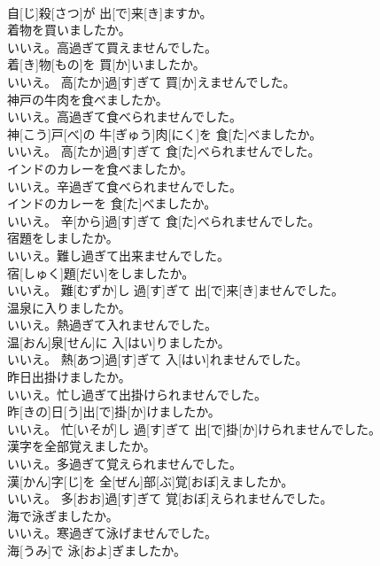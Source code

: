 \documentclass[8pt]{extreport}
\begin{document}
\begin{CJK}{UTF8}{min}
\\	自[じ]殺[さつ]が 出[で]来[き]ますか。
\\	着物を買いましたか。 
\\	いいえ。高過ぎて買えませんでした。	
\\	着[き]物[もの]を 買[か]いましたか。 
\\	いいえ。 高[たか]過[す]ぎて 買[か]えませんでした。
\\	神戸の牛肉を食べましたか。 
\\	いいえ。高過ぎて食べられませんでした。	
\\	神[こう]戸[べ]の 牛[ぎゅう]肉[にく]を 食[た]べましたか。 
\\	いいえ。 高[たか]過[す]ぎて 食[た]べられませんでした。
\\	インドのカレーを食べましたか。 
\\	いいえ。辛過ぎて食べられませんでした。	
\\	インドのカレーを 食[た]べましたか。 
\\	いいえ。 辛[から]過[す]ぎて 食[た]べられませんでした。
\\	宿題をしましたか。 
\\	いいえ。難し過ぎて出来ませんでした。	
\\	宿[しゅく]題[だい]をしましたか。 
\\	いいえ。 難[むずか]し 過[す]ぎて 出[で]来[き]ませんでした。
\\	温泉に入りましたか。 
\\	いいえ。熱過ぎて入れませんでした。	
\\	温[おん]泉[せん]に 入[はい]りましたか。 
\\	いいえ。 熱[あつ]過[す]ぎて 入[はい]れませんでした。
\\	昨日出掛けましたか。 
\\	いいえ。忙し過ぎて出掛けられませんでした。	
\\	昨[きの]日[う]出[で]掛[か]けましたか。 
\\	いいえ。 忙[いそが]し 過[す]ぎて 出[で]掛[か]けられませんでした。
\\	漢字を全部覚えましたか。 
\\	いいえ。多過ぎて覚えられませんでした。	
\\	漢[かん]字[じ]を 全[ぜん]部[ぶ]覚[おぼ]えましたか。 
\\	いいえ。 多[おお]過[す]ぎて 覚[おぼ]えられませんでした。
\\	海で泳ぎましたか。 
\\	いいえ。寒過ぎて泳げませんでした。	
\\	海[うみ]で 泳[およ]ぎましたか。 

\end{CJK}
\end{document}
